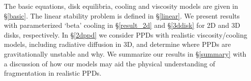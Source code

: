 \documentclass[iop, numberedappendix]{emulateapj}
\begin{document}
The basic equations, disk equilibria, cooling and viscosity models are 
given in \S\ref{basic}. The linear stability problem is defined in 
\S\ref{linear}. We present results with parameterized `beta' cooling in 
\S\ref{result_2d} and \S\ref{3ddisk} for 2D and 3D disks,
respectively. %
In \S\ref{2dppd} we consider PPDs with realistic viscosity/cooling   
models, including radiative diffusion in 3D, and determine where PPDs
are gravitationally unstable and why. We summarize our results in
\S\ref{summary} with a discussion of how our models may aid the 
physical understanding of fragmentation in realistic PPDs.   





 




\appendix




\end{document}
